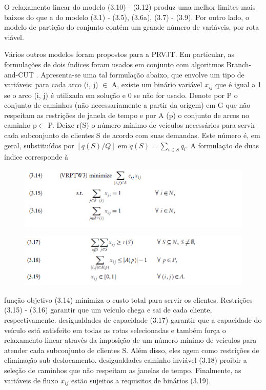  
O relaxamento linear do modelo (3.10) - (3.12) produz uma melhor limites mais baixos do que a do modelo (3.1) - (3.5), (3.6a), (3.7) - (3.9). Por outro lado, o modelo de partição do conjunto contém um grande número de variáveis, por rota viável.%

Vários outros modelos foram propostos para a PRVJT. Em particular, as formulações de dois índices foram usados em conjunto com algoritmos Branch-and-CUT . Apresenta-se uma tal formulação abaixo, que envolve um tipo de variáveis: para cada arco (i, j) $\in$ A, existe um binário variável $x_{ij}$ que é igual a 1 se o arco (i, j) é utilizada em solução e 0 se não for usado. Denote por P o conjunto de caminhos (não necessariamente a partir da origem) em G que não respeitam as restrições de janela de tempo e por A (p) o conjunto de arcos no caminho p$\in$ P. Deixe r(S) o número mínimo de veículos necessários para servir cada subconjunto de clientes S de acordo com suas demandas. Este número é, em geral, substituídos por $[q(S)/Q]$ em $q(S)=\sum\limits_{i \in S}q_i $. A formulação de duas índice corresponde à 

\begin{figure}[ht]
\centering
\includegraphics[scale=0.7]{figuras/math4.PNG}
\label{math4}
\end{figure}

\begin{figure}[ht]
\centering
\includegraphics[scale=0.7]{figuras/math5.PNG}
\label{math5}
\end{figure}

função objetivo (3.14) minimiza o custo total para servir os clientes. Restrições (3.15) - (3.16) garantir que um veículo chega e sai de cada cliente, respectivamente. desigualdades de capacidade (3.17) garantir que a capacidade do veículo está satisfeito em todas as rotas selecionadas e também força o relaxamento linear através da imposição de um número mínimo de veículos para atender cada subconjunto de clientes S. Além disso, eles agem como restrições de eliminação sub deslocamento. desigualdades caminho inviável (3.18) proibir a seleção de caminhos que não respeitam as janelas de tempo. Finalmente, as variáveis de fluxo $x_{ij}$ estão sujeitos a requisitos de binários (3.19).

